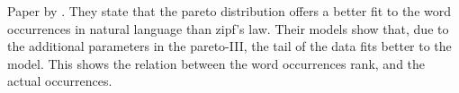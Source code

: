 \documentclass[../../Thesis.tex]{subfiles}
\begin{document}
Paper by \citet{wiegand2018word}. They state that the pareto distribution offers a better fit to the word occurrences in natural language than zipf's law. Their models show that, due to the additional parameters in the pareto-III, the tail of the data fits better to the model. This shows the relation between the word occurrences rank, and the actual occurrences.
\end{document}
